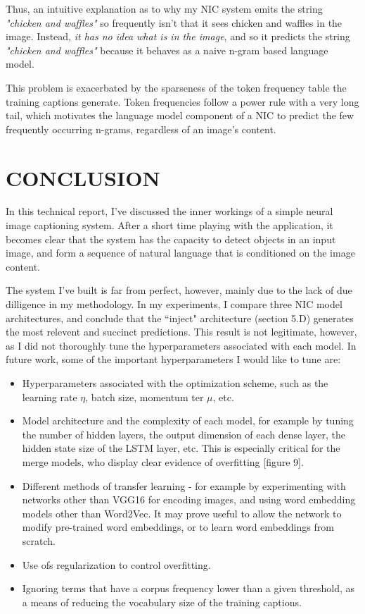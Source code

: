\documentclass[letterpaper, 10 pt, conference]{ieeeconf}
\begin{document}
Thus, an intuitive explanation as to why my NIC system emits the string \textit{"chicken and waffles"} so frequently isn't that it sees chicken and waffles in the image. Instead, \textit{it has no idea what is in the image}, and so it predicts the string \textit{"chicken and waffles"} because it behaves as a naive n-gram based language model. 

This problem is exacerbated by the sparseness of the token frequency table the training captions generate. Token frequencies follow a power rule with a very long tail, which motivates the language model component of a NIC to predict the few frequently occurring n-grams, regardless of an image's content. 

\section{CONCLUSION}

In this technical report, I've discussed the inner workings of a simple neural image captioning system. After a short time playing with the application, it becomes clear that the system has the capacity to detect objects in an input image, and form a sequence of natural language that is conditioned on the image content.

The system I've built is far from perfect, however, mainly due to the lack of due dilligence in my methodology. In my experiments, I compare three NIC model architectures, and conclude that the ``inject" architecture (section 5.D) generates the most relevent and succinct predictions. This result is not legitimate, however, as I did not thoroughly tune the hyperparameters associated with each model. In future work, some of the important hyperparameters I would like to tune are:
\begin{itemize}
\item Hyperparameters associated with the optimization scheme, such as the learning rate $\eta$, batch size, momentum ter $\mu$, etc. 
\item Model architecture and the complexity of each model, for example by tuning the number of hidden layers, the output dimension of each dense layer, the hidden state size of the LSTM layer, etc. This is especially critical for the merge models, who display clear evidence of overfitting [figure 9].
\item Different methods of transfer learning - for example by experimenting with networks other than VGG16 for encoding images, and using word embedding models other than Word2Vec. It may prove useful to allow the network to modify pre-trained word embeddings, or to learn word embeddings from scratch.
\item Use ofs regularization to control overfitting.
\item Ignoring terms that have a corpus frequency lower than a given threshold, as a means of reducing the vocabulary size of the training captions.
\end{itemize}
\end{document}
